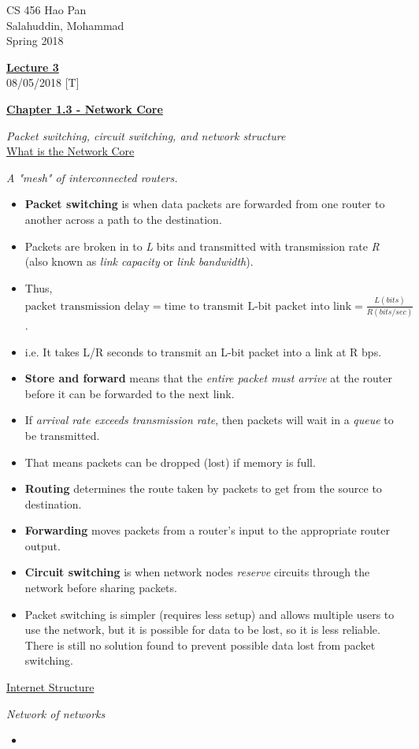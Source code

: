 \documentclass{article}
\begin{document}
\noindent
{CS 456 \hfill Hao Pan}\\
{Salahuddin, Mohammad}\\
{Spring 2018}


\begin{center}
\underline{\large \bf Lecture 3}\\
\noindent
{\hfill 08/05/2018 [T]}
\end{center}

\underline{\bf Chapter 1.3 - Network Core}\\
\vspace{-4mm}

{\it Packet switching, circuit switching, and network structure}\\

\underline{What is the Network Core}\\
\vspace{-4mm}

{\it A "mesh" of interconnected routers.}

\begin{itemize}
\item {\bf Packet switching} is when data packets are forwarded from one router to another across a path to the destination.
\item Packets are broken in to {\it L} bits and transmitted with transmission rate {\it R} (also known as {\it link capacity} or {\it link bandwidth}).
\item Thus, $\text{packet transmission delay} = \text{time to transmit L-bit packet into link} = \frac{L (bits)}{R(bits/sec)}$.
\item i.e. It takes L/R seconds to transmit an L-bit packet into a link at R bps.
\item {\bf Store and forward} means that the {\it entire packet must arrive} at the router before it can be forwarded to the next link.
\item If {\it arrival rate exceeds transmission rate}, then packets will wait in a {\it queue} to be transmitted.
\item That means packets can be dropped (lost) if memory is full.
\item {\bf Routing} determines the route taken by packets to get from the source to destination.
\item {\bf Forwarding} moves packets from a router's input to the appropriate router output.
\item {\bf Circuit switching} is when network nodes {\it reserve} circuits through the network before sharing packets.
\item Packet switching is simpler (requires less setup) and allows multiple users to use the network, but it is possible for data to be lost, so it is less reliable. There is still no solution found to prevent possible data lost from packet switching.
\end{itemize}

\underline{Internet Structure}\\
\vspace{-4mm}

{\it Network of networks}

\begin{itemize}
\item 
\end{itemize}
\end{document}
